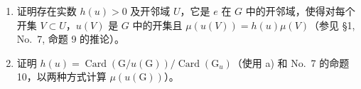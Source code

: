 \begin{enumerate}
\def\labelenumi{\alph{enumi})}
\item
  证明存在实数 \(h(u) > 0\) 及开邻域 \(U\)，它是 \(e\) 在 \(G\) 中的开邻域，使得对每个开集 \(V \subset U\)，\(u(V)\) 是 \(G\) 中的开集且 \(\mu(u(V)) = h(u)\mu(V)\)（参见 §1, No.~7, 命题 9 的推论）。
\item
  证明 \(h(u) = \operatorname{Card}(\mathrm{G} / u(\mathrm{G})) / \operatorname{Card}(\mathrm{G}_u)\)（使用 a) 和 No.~7 的命题 10，以两种方式计算 \(\mu(u(\mathrm{G}))\)）。
\end{enumerate}

